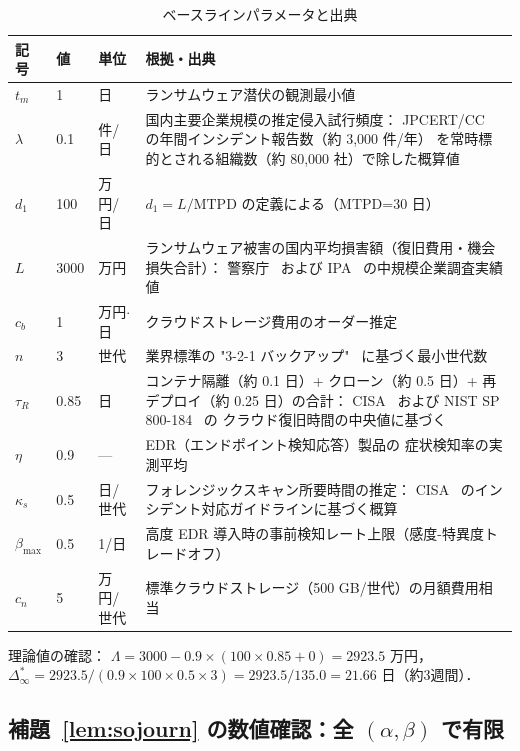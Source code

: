 \documentclass[12pt,a4paper]{article}
\theoremstyle{plain}
\theoremstyle{definition}
\theoremstyle{remark}
\newcommand{\Dinf}{\Delta^{*}_{\infty}}
\newcommand{\La}{\Lambda}
\begin{document}
\begin{table}[h]
\centering\small
\caption{ベースラインパラメータと出典}
\label{tab:params}
\begin{tabular}{@{}lll p{72mm}@{}}
\toprule
記号 & 値 & 単位 & 根拠・出典 \\
\midrule
$t_m$ & 1 & 日 & ランサムウェア潜伏の観測最小値~\cite{mandiant2023,crowdstrike2023} \\
$\lambda$ & 0.1 & 件/日 & 国内主要企業規模の推定侵入試行頻度：
  JPCERT/CC~\cite{jpcert2023} の年間インシデント報告数（約 3,000 件/年）
  を常時標的とされる組織数（約 80,000 社）で除した概算値 \\
$d_1$ & 100 & 万円/日 & $d_1=L/\mathrm{MTPD}$ の定義による（MTPD=30 日） \\
$L$ & 3000 & 万円 & ランサムウェア被害の国内平均損害額（復旧費用・機会損失合計）：
  警察庁~\cite{npa2023} および IPA~\cite{ipa2024} の中規模企業調査実績値 \\
$c_b$ & 1 & 万円$\cdot$日 & クラウドストレージ費用のオーダー推定 \\
$n$ & 3 & 世代 & 業界標準の "3-2-1 バックアップ"~\cite{cisa2020} に基づく最小世代数 \\
$\tau_R$ & 0.85 & 日 & コンテナ隔離（約 0.1 日）+ クローン（約 0.5 日）+
  再デプロイ（約 0.25 日）の合計：
  CISA~\cite{cisa2020} および NIST SP 800-184~\cite{nist80034} の
  クラウド復旧時間の中央値に基づく \\
$\eta$ & 0.9 & --- & EDR（エンドポイント検知応答）製品の
  症状検知率の実測平均~\cite{crowdstrike2023,sophos2023} \\
$\kappa_s$ & 0.5 & 日/世代 & フォレンジックスキャン所要時間の推定：
  CISA~\cite{cisa2020} のインシデント対応ガイドラインに基づく概算 \\
$\beta_{\max}$ & 0.5 & 1/日 & 高度 EDR 導入時の事前検知レート上限（感度-特異度トレードオフ）~\cite{crowdstrike2023} \\
$c_n$ & 5 & 万円/世代 & 標準クラウドストレージ（500 GB/世代）の月額費用相当 \\
\bottomrule
\end{tabular}
\end{table}

理論値の確認：
$\La=3000-0.9\times(100\times0.85+0)=2923.5$ 万円，
$\Dinf=2923.5/(0.9\times100\times0.5\times3)=2923.5/135.0=21.66$ 日（約3週間）．

\subsection{補題~\ref{lem:sojourn} の数値確認：全 $(\alpha,\beta)$ で有限}
\end{document}
